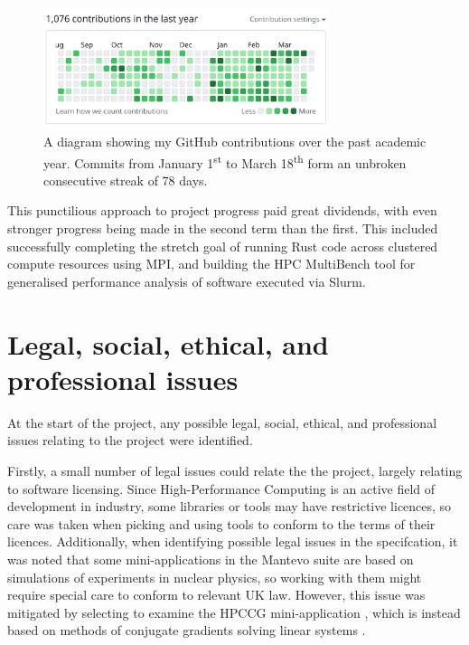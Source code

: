 \begin{figure}[h]
    \centering
    \includegraphics[width=0.75\textwidth]{images/6_project_management/github_year_long_contributions.png}
    \caption{A diagram showing my GitHub contributions over the past academic year. Commits from January 1\textsuperscript{st} to March 18\textsuperscript{th} form an unbroken consecutive streak of 78 days.}
    \label{fig:github_year_long_contributions}
\end{figure}

This punctilious approach to project progress paid great dividends, with even stronger progress being made in the second term than the first. This included successfully completing the stretch goal of running Rust code across clustered compute resources using MPI, and building the HPC MultiBench tool for generalised performance analysis of software executed via Slurm.

\section{Legal, social, ethical, and professional issues}
\label{sec:legal-social-ethical-professional-issues}

At the start of the project, any possible legal, social, ethical, and professional issues relating to the project were identified. 

Firstly, a small number of legal issues could relate the the project, largely relating to software licensing. Since High-Performance Computing is an active field of development in industry, some libraries or tools may have restrictive licences, so care was taken when picking and using tools to conform to the terms of their licences. Additionally, when identifying possible legal issues in the specifcation, it was noted that some mini-applications in the Mantevo suite are based on simulations of experiments in nuclear physics, so working with them might require special care to conform to relevant UK law. However, this issue was mitigated by selecting to examine the HPCCG mini-application \cite{herouxHPCCGSolverPackage2007}, which is instead based on methods of conjugate gradients solving linear systems \cite{hestenesMethodsConjugateGradients1952}.

